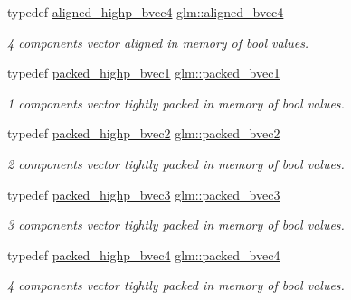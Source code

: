 \begin{DoxyCompactItemize}
typedef \mbox{\hyperlink{group__gtc__type__aligned_ga833e4cd7402677f8ca56795a12d8bec0}{aligned\+\_\+highp\+\_\+bvec4}} \mbox{\hyperlink{group__gtc__type__aligned_gaa62e46e15c76ced942cdeba89776c5f6}{glm\+::aligned\+\_\+bvec4}}
\begin{DoxyCompactList}\small\item\em 4 components vector aligned in memory of bool values. \end{DoxyCompactList}\item 
typedef \mbox{\hyperlink{group__gtc__type__aligned_ga00ef8acfca23dca78e1baa65bb5861ac}{packed\+\_\+highp\+\_\+bvec1}} \mbox{\hyperlink{group__gtc__type__aligned_ga9afdf9c24a30d7c6c46fa29011908ac5}{glm\+::packed\+\_\+bvec1}}
\begin{DoxyCompactList}\small\item\em 1 components vector tightly packed in memory of bool values. \end{DoxyCompactList}\item 
typedef \mbox{\hyperlink{group__gtc__type__aligned_ga8059c50785881a9f30b9a8e3ff5daf83}{packed\+\_\+highp\+\_\+bvec2}} \mbox{\hyperlink{group__gtc__type__aligned_gabbb5ab4c9a0de67e04e2f183c0bff576}{glm\+::packed\+\_\+bvec2}}
\begin{DoxyCompactList}\small\item\em 2 components vector tightly packed in memory of bool values. \end{DoxyCompactList}\item 
typedef \mbox{\hyperlink{group__gtc__type__aligned_gafad47eaff82deab03a1e8d82d2dbd046}{packed\+\_\+highp\+\_\+bvec3}} \mbox{\hyperlink{group__gtc__type__aligned_gae53d997456f6336eab2450117b11163e}{glm\+::packed\+\_\+bvec3}}
\begin{DoxyCompactList}\small\item\em 3 components vector tightly packed in memory of bool values. \end{DoxyCompactList}\item 
typedef \mbox{\hyperlink{group__gtc__type__aligned_gaa7a006e26052e668a16bf3b8bd81cbef}{packed\+\_\+highp\+\_\+bvec4}} \mbox{\hyperlink{group__gtc__type__aligned_ga27837cfec1a5b6d6ae23961f93431403}{glm\+::packed\+\_\+bvec4}}
\begin{DoxyCompactList}\small\item\em 4 components vector tightly packed in memory of bool values. \end{DoxyCompactList}\end{DoxyCompactItemize}


